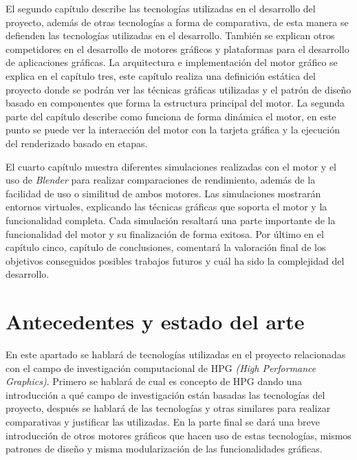\documentclass[a4paper]{book}
\begin{document}
El segundo capítulo describe las tecnologías utilizadas en el desarrollo del proyecto, además de otras
tecnologías a forma de comparativa, de esta manera se defienden las tecnologías utilizadas en el desarrollo. También
se explican otros competidores en el desarrollo de motores gráficos y plataformas para el desarrollo de aplicaciones
gráficas. La arquitectura e implementación del motor gráfico se explica en el capítulo tres, este capítulo realiza 
una definición estática del proyecto donde se podrán ver las técnicas gráficas utilizadas y el patrón de diseño basado en
componentes que forma la estructura principal del motor. La segunda parte del capítulo describe como
funciona de forma dinámica el motor, en este punto se puede ver la interacción del motor con la tarjeta
gráfica y la ejecución del renderizado basado en etapas.

El cuarto capítulo muestra diferentes simulaciones realizadas con el motor y el uso de \textit{Blender} para realizar
comparaciones de rendimiento, además de la facilidad de uso o similitud de ambos motores. Las simulaciones mostrarán
entornos virtuales, explicando las técnicas gráficas que soporta el motor y la funcionalidad completa. Cada simulación
resaltará una parte importante de la funcionalidad del motor y su finalización de forma exitosa. Por último en el capítulo cinco,
capítulo de conclusiones, comentará la valoración final de los objetivos conseguidos posibles trabajos futuros y cuál ha sido la
complejidad del desarrollo.


\cleardoublepage
\chapter{Antecedentes y estado del arte}

En este apartado se hablará de tecnologías utilizadas en el proyecto relacionadas con el campo de investigación
computacional de HPG \textit{(High Performance Graphics)}. Primero se hablará de cual es concepto de HPG
dando una introducción a qué campo de investigación están basadas las tecnologías del proyecto, después
se hablará de las tecnologías y otras similares para realizar comparativas y justificar las utilizadas. En 
la parte final se dará una breve introducción de otros motores gráficos que hacen uso de estas tecnologías,
mismos patrones de diseño y misma modularización de las funcionalidades gráficas.
\end{document}
